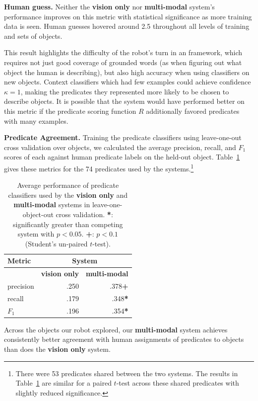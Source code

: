 \textbf{Human guess.} Neither the \textbf{vision only} nor \textbf{multi-modal} system's performance improves on this metric with statistical significance as more training data is seen.
Human guesses hovered around 2.5 throughout all levels of training and sets of objects.

This result highlights the difficulty of the robot's turn in an \ispy framework, which requires not just good coverage of grounded words (as when figuring out what object the human is describing), but also high accuracy when using classifiers on new objects.
Context classifiers which had few examples could achieve confidence $\kappa=1$, making the predicates they represented more likely to be chosen to describe objects.
It is possible that the system would have performed better on this metric if the predicate scoring function $R$ additionally favored predicates with many examples.

\textbf{Predicate Agreement.} Training the predicate classifiers using leave-one-out cross validation over objects, we calculated the average precision, recall, and $F_1$ scores of each against human predicate labels on the held-out object.
Table~\ref{tab:predicate_results} gives these metrics for the 74 predicates used by the systems.\footnote{There were 53 predicates shared between the two systems.
The results in Table~\ref{tab:predicate_results} are similar for a paired $t$-test across these shared predicates with slightly reduced significance.}

\begin{table}
\centering
\begin{tabular}[h]{|l|r|r|}
	\hline
	\bf Metric & \multicolumn{2}{c|}{\bf System} \\ \hline \hline
	& \bf vision only & \bf multi-modal \\ \hline
	precision & .250 & .378\textbf{+} \\
	recall & .179 & .348\textbf{*} \\
	\bf $F_1$ & .196 & .354\textbf{*} \\ \hline
\end{tabular}
\caption{Average performance of predicate classifiers used by the \textbf{vision only} and \textbf{multi-modal} systems in leave-one-object-out cross validation.
\textbf{*}: significantly greater than competing system with $p<0.05$.
\textbf{+}: $p<0.1$ (Student's un-paired $t$-test).}
\label{tab:predicate_results}
\end{table}

Across the objects our robot explored, our \textbf{multi-modal} system achieves consistently better agreement with human assignments of predicates to objects than does the \textbf{vision only} system.

